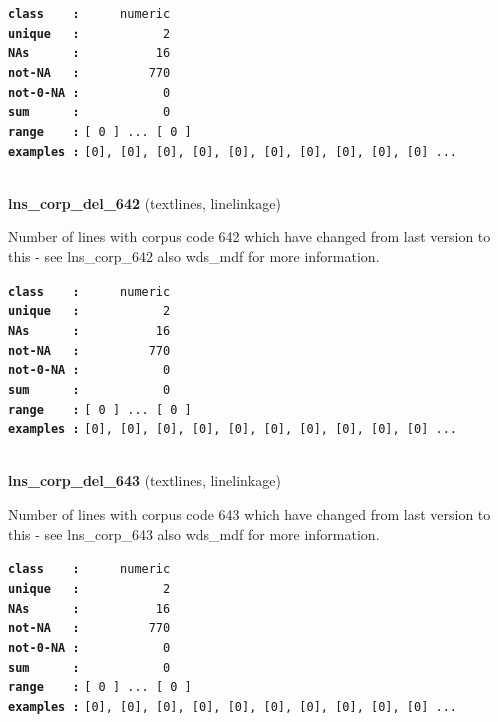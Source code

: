\documentclass[]{article}
\begin{document}
\textbf{\texttt{class\ \ \ \ :}} \texttt{~~~~~numeric}\\
\textbf{\texttt{unique\ \ \ :}} \texttt{~~~~~~~~~~~2}\\
\textbf{\texttt{NAs\ \ \ \ \ \ :}} \texttt{~~~~~~~~~~16}\\
\textbf{\texttt{not-NA\ \ \ :}} \texttt{~~~~~~~~~770}\\
\textbf{\texttt{not-0-NA\ :}} \texttt{~~~~~~~~~~~0}\\
\textbf{\texttt{sum\ \ \ \ \ \ :}} \texttt{~~~~~~~~~~~0}\\
\textbf{\texttt{range\ \ \ \ :}}
\texttt{{[}\ 0\ {]}\ ...\ {[}\ 0\ {]}}\\
\textbf{\texttt{examples\ :}}
\texttt{{[}0{]},\ {[}0{]},\ {[}0{]},\ {[}0{]},\ {[}0{]},\ {[}0{]},\ {[}0{]},\ {[}0{]},\ {[}0{]},\ {[}0{]}\ ...}\\

~

\textbf{lns\_corp\_del\_642} (textlines, linelinkage)

Number of lines with corpus code 642 which have changed from last
version to this - see lns\_corp\_642 also wds\_mdf for more information.

\textbf{\texttt{class\ \ \ \ :}} \texttt{~~~~~numeric}\\
\textbf{\texttt{unique\ \ \ :}} \texttt{~~~~~~~~~~~2}\\
\textbf{\texttt{NAs\ \ \ \ \ \ :}} \texttt{~~~~~~~~~~16}\\
\textbf{\texttt{not-NA\ \ \ :}} \texttt{~~~~~~~~~770}\\
\textbf{\texttt{not-0-NA\ :}} \texttt{~~~~~~~~~~~0}\\
\textbf{\texttt{sum\ \ \ \ \ \ :}} \texttt{~~~~~~~~~~~0}\\
\textbf{\texttt{range\ \ \ \ :}}
\texttt{{[}\ 0\ {]}\ ...\ {[}\ 0\ {]}}\\
\textbf{\texttt{examples\ :}}
\texttt{{[}0{]},\ {[}0{]},\ {[}0{]},\ {[}0{]},\ {[}0{]},\ {[}0{]},\ {[}0{]},\ {[}0{]},\ {[}0{]},\ {[}0{]}\ ...}\\

~

\textbf{lns\_corp\_del\_643} (textlines, linelinkage)

Number of lines with corpus code 643 which have changed from last
version to this - see lns\_corp\_643 also wds\_mdf for more information.

\textbf{\texttt{class\ \ \ \ :}} \texttt{~~~~~numeric}\\
\textbf{\texttt{unique\ \ \ :}} \texttt{~~~~~~~~~~~2}\\
\textbf{\texttt{NAs\ \ \ \ \ \ :}} \texttt{~~~~~~~~~~16}\\
\textbf{\texttt{not-NA\ \ \ :}} \texttt{~~~~~~~~~770}\\
\textbf{\texttt{not-0-NA\ :}} \texttt{~~~~~~~~~~~0}\\
\textbf{\texttt{sum\ \ \ \ \ \ :}} \texttt{~~~~~~~~~~~0}\\
\textbf{\texttt{range\ \ \ \ :}}
\texttt{{[}\ 0\ {]}\ ...\ {[}\ 0\ {]}}\\
\textbf{\texttt{examples\ :}}
\texttt{{[}0{]},\ {[}0{]},\ {[}0{]},\ {[}0{]},\ {[}0{]},\ {[}0{]},\ {[}0{]},\ {[}0{]},\ {[}0{]},\ {[}0{]}\ ...}\\
\end{document}
